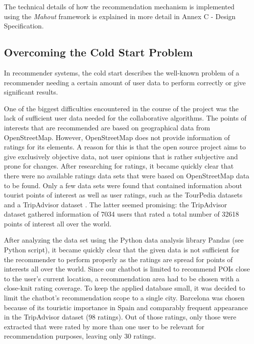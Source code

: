 The technical details of how the recommendation mechanism is implemented using the \textit{Mahout} framework is explained in more detail in Annex C - Design Specification.

\subsection{Overcoming the Cold Start Problem}
In recommender systems, the cold start describes the well-known problem of a recommender needing a certain amount of user data to perform correctly or give significant results. 

One of the biggest difficulties encountered in the course of the project was the lack of sufficient user data needed for the collaborative algorithms. The points of interests that are recommended are based on geographical data from OpenStreetMap. However, OpenStreetMap does not provide information of ratings for its elements. A reason for this is that the open source project aims to give exclusively objective data, not user opinions that is rather subjective and prone for changes. After researching for ratings, it became quickly clear that there were no available ratings data sets that were based on OpenStreetMap data to be found. Only a few data sets were found that contained information about tourist points of interest as well as user ratings, such as the TourPedia datasets \cite{tourpedia} and a TripAdvisor dataset \cite{roshchina15}. The latter seemed promising: the TripAdvisor dataset gathered information of 7034 users that rated a total number of 32618 points of interest all over the world.

After analyzing the data set using the Python data analysis library Pandas (see Python script), it became quickly clear that the given data is not sufficient for the recommender to perform properly as the ratings are spread for points of interests all over the world. Since our chatbot is limited to recommend POIs close to the user’s current location, a recommendation area had to be chosen with a close-knit rating coverage. To keep the applied database small, it was decided to limit the chatbot’s recommendation scope to a single city. Barcelona was chosen because of its touristic importance in Spain and comparably frequent appearance in the TripAdvisor dataset (98 ratings). Out of those ratings, only those were extracted that were rated by more than one user to be relevant for recommendation purposes, leaving only 30 ratings.

